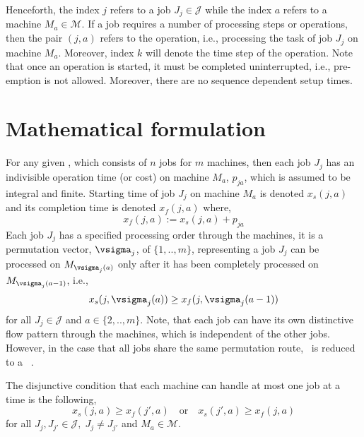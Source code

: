 Henceforth, the index $j$ refers to a job $J_j\in\mathcal{J}$ while the index $a$ refers to a machine $M_a\in\mathcal{M}$. If a job requires a number of processing steps or operations, then the pair $(j,a)$ refers to the operation, i.e., processing the task of job $J_j$ on machine $M_a$. Moreover, index $k$ will denote the time step of the operation. Note that once an operation is started, it must be completed uninterrupted, i.e., pre-emption is not allowed. Moreover, there are no sequence dependent setup times.

\section{Mathematical formulation}
For any given \JSP, which consists of $n$ jobs for $m$ machines, then each job $J_j$ has an indivisible operation time (or cost) on machine $M_a$, $p_{ja}$, which is assumed to be integral and finite. 
Starting time of job $J_j$ on machine $M_a$ is denoted $x_s(j,a)$ and its completion time is denoted $x_f(j,a)$ where, 
\begin{equation}  x_f(j,a):=x_s(j,a)+p_{ja} \end{equation} 
Each job $J_j$ has a specified processing order through the machines, it is a permutation vector, $\vsigma_j$, of $\{1,..,m\}$, representing a job $J_j$ can be processed on $M_{\vsigma_j(a)}$ only after it has been completely processed on $M_{\vsigma_j(a-1)}$, i.e.,
\begin{equation}\label{eq:permutation}
   x_s(j,\vsigma_j(a)) \geq x_f(j,\vsigma_j(a-1)) 
\end{equation}
for all $J_j\in\mathcal{J}$ and $a\in\{2,..,m\}$. 
Note, that each job can have its own distinctive flow pattern through the machines, which is independent of the other jobs. However, in the case that all jobs share the same permutation route, \JSP\ is reduced to a \FSP\ \citep{Guinet1998,Tay08}.

The disjunctive condition that each machine can handle at most one job at a time is the following,
\begin{equation}\label{eq:oneJobPerMac}
   x_s(j,a) \geq x_f(j',a) \quad\textrm{or}\quad x_s(j',a) \geq x_f(j,a)  
\end{equation}
for all $J_j,J_{j'}\in\mathcal{J},\; J_j\neq J_{j'}$ and $M_a\in\mathcal{M}$. 

